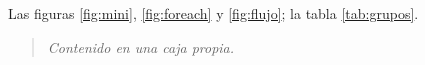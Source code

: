 \documentclass[11pt,a4paper]{article}
\begin{document}
\begin{center}
\end{center}
Las figuras \ref{fig:mini}, \ref{fig:foreach} y \ref{fig:flujo}; la tabla \ref{tab:grupos}.

\newenvironment{caja}{\begin{quote}\itshape}{\end{quote}}
\begin{caja}
Contenido en una caja propia.
\end{caja}



\end{document}
